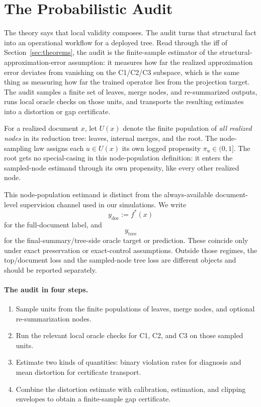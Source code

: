 \section{The Probabilistic Audit}\label{sec:estimation}

The theory says that local validity composes. The audit turns that structural fact into an operational workflow for a deployed tree. Read through the iff of Section~\ref{sec:theorems}, the audit is the finite-sample estimator of the structural-approximation-error assumption: it measures how far the realized approximation error deviates from vanishing on the C1/C2/C3 subspace, which is the same thing as measuring how far the trained operator lies from the projection target. The audit samples a finite set of leaves, merge nodes, and re-summarized outputs, runs local oracle checks on those units, and transports the resulting estimates into a distortion or gap certificate.

For a realized document $x$, let $U(x)$ denote the finite population of \emph{all realized nodes} in its reduction tree: leaves, internal merges, and the root. The node-sampling law assigns each $u \in U(x)$ its own logged propensity $\pi_u \in (0,1]$. The root gets no special-casing in this node-population definition: it enters the sampled-node estimand through its own propensity, like every other realized node.

This node-population estimand is distinct from the always-available document-level supervision channel used in our simulations. We write
\[
y_{\mathrm{doc}} := f^\ast(x)
\]
for the full-document label, and
\[
y_{\mathrm{tree}}
\]
for the final-summary/tree-side oracle target or prediction. These coincide only under exact preservation or exact-control assumptions. Outside those regimes, the top/document loss and the sampled-node tree loss are different objects and should be reported separately.

\paragraph{The audit in four steps.}
\begin{enumerate}[leftmargin=1.5em]
    \item Sample units from the finite populations of leaves, merge nodes, and optional re-summarization nodes.
    \item Run the relevant local oracle checks for C1, C2, and C3 on those sampled units.
    \item Estimate two kinds of quantities: binary violation rates for diagnosis and mean distortion for certificate transport.
    \item Combine the distortion estimate with calibration, estimation, and clipping envelopes to obtain a finite-sample gap certificate.
\end{enumerate}

